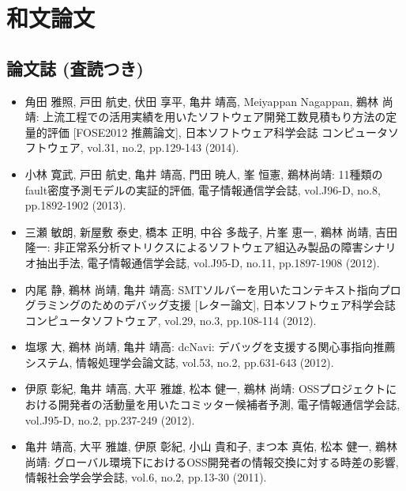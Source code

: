 \documentclass{jarticle}
\begin{document}
\section{和文論文}

\subsection{論文誌 (査読つき)}

\begin{itemize}
\item 角田 雅照, 戸田 航史, 伏田 享平, 亀井 靖高, Meiyappan Nagappan, 鵜林 尚靖:
上流工程での活用実績を用いたソフトウェア開発工数見積もり方法の定量的評価 [FOSE2012 推薦論文],
日本ソフトウェア科学会誌 コンピュータソフトウェア,
vol.31, no.2, pp.129-143 (2014).

\item 小林 寛武, 戸田 航史, 亀井 靖高, 門田 暁人, 峯 恒憲, 鵜林尚靖:
11種類のfault密度予測モデルの実証的評価,
電子情報通信学会誌,
vol.J96-D, no.8, pp.1892-1902 (2013).

\item 三瀬 敏朗, 新屋敷 泰史, 橋本 正明, 中谷 多哉子, 片峯 恵一, 鵜林 尚靖, 吉田 隆一:
非正常系分析マトリクスによるソフトウェア組込み製品の障害シナリオ抽出手法,
電子情報通信学会誌,
vol.J95-D, no.11, pp.1897-1908 (2012).

\item 内尾 静, 鵜林 尚靖, 亀井 靖高:
SMTソルバーを用いたコンテキスト指向プログラミングのためのデバッグ支援 [レター論文],
日本ソフトウェア科学会誌 コンピュータソフトウェア,
vol.29, no.3, pp.108-114 (2012).

\item 塩塚 大, 鵜林 尚靖, 亀井 靖高:
dcNavi: デバッグを支援する関心事指向推薦システム,
情報処理学会論文誌,
vol.53, no.2, pp.631-643 (2012).

\item 伊原 彰紀, 亀井 靖高, 大平 雅雄, 松本 健一, 鵜林 尚靖:
OSSプロジェクトにおける開発者の活動量を用いたコミッター候補者予測,
電子情報通信学会誌,
vol.J95-D, no.2, pp.237-249 (2012).

\item 亀井 靖高, 大平 雅雄, 伊原 彰紀, 小山 貴和子, まつ本 真佑, 松本 健一, 鵜林 尚靖:
グローバル環境下におけるOSS開発者の情報交換に対する時差の影響,
情報社会学会学会誌,
vol.6, no.2, pp.13-30 (2011).


\end{itemize}
\end{document}
